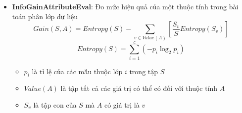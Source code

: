 \documentclass[a4paper, 12pt]{article}
\begin{document}
\begin{itemize}
\begin{itemize}
        \item \textbf{InfoGainAttributeEval}: Đo mức hiệu quả của một thuộc tính trong bài toán phân lớp dữ liệu 
        $$Gain(S, A) = Entropy(S) - \sum_{v \in Value(A)} [\frac{S_v}{S}Entropy(S_v)]$$ $$Entropy(S) = \sum_{i = 1}^{c} (-p_i \log_2 p_i)$$
        \begin{itemize}
            \item $p_i$ là tỉ lệ của các mẫu thuộc lớp $i$ trong tập $S$
            \item $Value(A)$ là tập tất cả các giá trị có thể có đối với thuộc tính $A$
            \item $S_v$ là tập con của $S$ mà $A$ có giá trị là $v$
        \end{itemize}
    \end{itemize}


\end{itemize}
\end{document}

